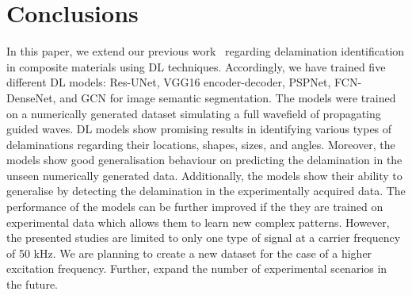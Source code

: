 \section{Conclusions}
\label{conclusion}
In this paper, we extend our previous work~\cite{Ijjeh2021} regarding delamination identification in composite materials using DL techniques. 
Accordingly, we have trained five different DL models: Res-UNet, VGG16 encoder-decoder, PSPNet, FCN-DenseNet, and GCN for image semantic segmentation.
The models were trained on a numerically generated dataset simulating a full wavefield of propagating guided waves.
DL models show promising results in identifying various types of delaminations regarding their locations, shapes, sizes, and angles. 
Moreover, the models show good generalisation behaviour on predicting the delamination in the unseen numerically generated data.
Additionally, the models show their ability to generalise by detecting the delamination in the experimentally acquired data.
The performance of the models can be further improved if the they are trained on experimental data which allows them to learn new complex patterns.
However, the presented studies are limited to only one type of signal at a carrier frequency of 50 kHz. 
We are planning to create a new dataset for the case of a higher excitation frequency. 
Further, expand the number of experimental scenarios in the future.